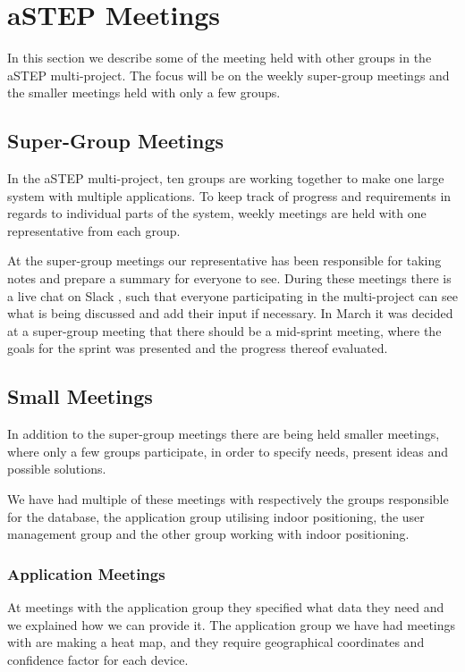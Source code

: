 \section{aSTEP Meetings}
In this section we describe some of the meeting held with other groups in the aSTEP multi-project. The focus will be on the weekly super-group meetings and the smaller meetings held with only a few groups.

\subsection*{Super-Group Meetings}\label{subsec:supergroup_meetings}
In the aSTEP multi-project, ten groups are working together to make one large system with multiple applications. To keep track of progress and requirements in regards to individual parts of the system, weekly meetings are held with one representative from each group.

At the super-group meetings our representative has been responsible for taking notes and prepare a summary for everyone to see. During these meetings there is a live chat on Slack \cite{slack}, such that everyone participating in the multi-project can see what is being discussed and add their input if necessary. In March it was decided at a super-group meeting that there should be a mid-sprint meeting, where the goals for the sprint was presented and the progress thereof evaluated.

\subsection*{Small Meetings}\label{subsec:small_meetings}
In addition to the super-group meetings there are being held smaller meetings, where only a few groups participate, in order to specify needs, present ideas and possible solutions.

We have had multiple of these meetings with respectively the groups responsible for the database, the application group utilising indoor positioning, the user management group and the other group working with indoor positioning.
 
\subsubsection*{Application Meetings}
At meetings with the application group they specified what data they need and we explained how we can provide it. The application group we have had meetings with are making a heat map, and they require geographical coordinates and confidence factor for each device.


